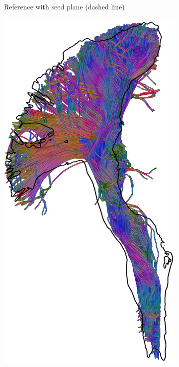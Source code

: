 \begin{figure}[t]
\begin{minipage}{0.19\linewidth}
\begin{subfigure}[b]{\linewidth}
		\caption{Reference with seed plane (dashed line)}
	\end{subfigure}
\end{minipage}
\hfil
	\begin{minipage}{0.19\linewidth}
		\begin{subfigure}[b]{\linewidth}
		\includegraphics[width=\linewidth]{cst-rank-c}

\end{subfigure}
\end{minipage}
\end{figure}

